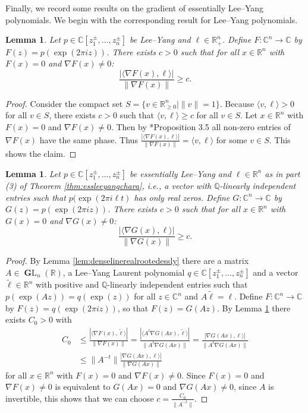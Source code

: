 \documentclass[11pt,letterpaper]{amsart}
\theoremstyle{definition}
\theoremstyle{plain}
\newtheorem{lem}[Def]{Lemma}
\newcommand{\GL}{\operatorname{{\mathbf GL}}}
\newcommand{\C}{{\mathbb C}}
\newcommand{\R}{{\mathbb R}}
\newcommand{\Q}{{\mathbb Q}}
\begin{document}
Finally, we record some results on the gradient of essentially Lee--Yang polynomials. We begin with the corresponding result for Lee--Yang polynomials.
\begin{lem}\label{lem:leeyanglowerbound}
    Let $p\in\C[z_1^{\pm},\ldots,z_n^{\pm}]$ be Lee--Yang  and $\ell\in\R_{+}^n$. Define $F\colon\C^n\to\C$ by $F(z)=p(\exp(2\pi i z))$. There exists $c>0$ such that for all $x\in\R^n$ with $F(x)=0$ and $\nabla F(x)\neq0$:  $$\frac{|\langle\nabla F(x),\ell\rangle|}{\|\nabla F(x)\|}\geq c.$$
\end{lem}
\begin{proof}
    Consider the compact set $S=\{v\in\R_{\geq0}^n\mid \|v\|=1\}$. Because $\langle v,\ell\rangle>0$ for all $v\in S$, there exists $c>0$ such that $\langle v,\ell\rangle\geq c$ for all $v\in S$.
    Let $x\in\R^n$ with $F(x)=0$ and $\nabla F(x)\neq0$. Then by \cite{AlonVinzant}*{Proposition 3.5} all non-zero entries of $\nabla F(x)$ have the same phase. Thus $\frac{|\langle\nabla F(x),\ell\rangle|}{\|\nabla F(x)\|}=\langle v,\ell\rangle$ for some $v\in S$. This shows the claim.
\end{proof}

\begin{lem}\label{lem:essleeyanglowerbound}
    Let $p\in\C[z_1^{\pm},\ldots,z_n^{\pm}]$ be essentially Lee--Yang and $\ell\in\R^n$ as in part (3) of Theorem \ref{thm:essleeyangchara}, i.e., a vector with $\Q$-linearly independent entries such that $p(\exp(2\pi i \ell t)$ has only real zeros. 
    Define $G\colon\C^n\to\C$ by $G(z)=p(\exp(2\pi i z))$.
    There exists $c>0$ such that for all $x\in\R^n$ with $G(x)=0$ and $\nabla G(x)\neq0$:  $$\frac{|\langle\nabla G(x),\ell\rangle|}{\|\nabla G(x)\|}\geq c.$$
\end{lem}
\begin{proof}
    By Lemma \ref{lem:denselinerealrootedessly} there are a matrix $A\in\GL_n(\R)$, a Lee--Yang Laurent polynomial $q\in\C[z_1^{\pm},\ldots,z_n^{\pm}]$ and a vector $\tilde\ell\in\R^n$ with positive and $\Q$-linearly independent entries such that $p(\exp(Az))=q(\exp(z))$ for all $z\in\C^n$ and $A\tilde\ell=\ell$. 
    Define $F\colon\C^n\to\C$ by $F(z)=q(\exp(2\pi i z))$, so that $F(z)=G(Az)$. By Lemma \ref{lem:leeyanglowerbound} there exists $C_0>0$ with
      \begin{align*}
        C_0&\leq\frac{|\langle\nabla F(x),\tilde\ell\rangle|}{\|\nabla F(x)\|}=\frac{|\langle A^t\nabla G(Ax),\tilde\ell\rangle|}{\| A^t\nabla G(Ax)\|}=\frac{|\nabla G(Ax),\ell\rangle|}{\|A^t \nabla G(Ax)\|}\\ &\leq\|A^{-t}\|\frac{|\nabla G(Ax),\ell\rangle|}{\|\nabla G(Ax)\|}  
      \end{align*}
      for all $x\in\R^n$ with $F(x)=0$ and $\nabla F(x)\neq0$. Since $F(x)=0$ and $\nabla F(x)\neq0$ is equivalent to $G(Ax)=0$ and $\nabla G(Ax)\neq0$,  since $A$ is invertible, this shows that we can choose $c=\frac{C_0}{\|A^{-t}\|}$.
\end{proof}
\end{document}
